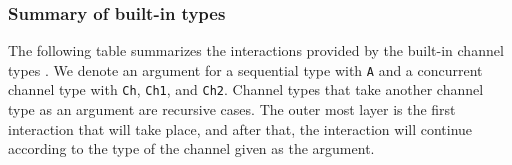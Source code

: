 \documentclass[11pt]{article}
\begin{document}
%


\subsubsection{Summary of built-in types}
The following table summarizes the interactions provided by the built-in channel types \cite[Section 3.3.2]{Prashanth-thesis}.
We denote an argument for a sequential type with \lstinline$A$ and a concurrent channel type with \lstinline$Ch$, \lstinline$Ch1$, and \lstinline$Ch2$.
Channel types that take another channel type as an argument are recursive cases. 
The outer most layer is the first interaction that will take place, and after that, the interaction will continue according to the type of the channel given as the argument.
\end{document}
